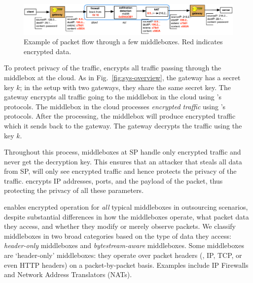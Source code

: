 \begin{figure}[t!]
\centering
  \includegraphics[width=6.7in]{fig/packetpath.pdf}
\caption{Example of packet flow through a few middleboxes. Red indicates encrypted data. \label{fig:packetflow}}
\end{figure}



To protect privacy of the traffic, \sys encrypts all traffic passing through the middlebox at the cloud. 
As in Fig.~\ref{fig:sys-overview}, the gateway has a secret key $k$; in the setup with two gateways, they share
the same secret key. The gateway encrypts all traffic going to the middlebox in the cloud using \sys's protocols.
The middlebox in the cloud processes {\em encrypted traffic} using \sys's protocols. 
After the processing, the middlebox
will produce encrypted traffic which it sends back to the gateway. The gateway decrypts the traffic using the key $k$.

Throughout this process, middleboxes at SP handle only encrypted traffic and never get the decryption key. This ensures
that an attacker that steals all data from SP, will only see encrypted traffic and hence protects the privacy of the 
traffic. 
\sys encrypts IP addresses, ports, and the payload of the packet, thus protecting the privacy of all these parameters. 

\sys enables encrypted operation for {\em all} typical middleboxes in outsourcing scenarios, despite substantial differences in how the middleboxes operate, what packet data they access, and whether they modify or merely observe packets.
  We classify middleboxes in  two broad categories based on the type of data they access: {\em header-only} middleboxes and {\em bytestream-aware} middleboxes.
  Some middleboxes are `header-only' middleboxes: they operate over packet headers (\eg{}, IP, TCP, or even HTTP headers) on a packet-by-packet basis.
Examples  include IP Firewalls and Network Address Translators (NATs).


